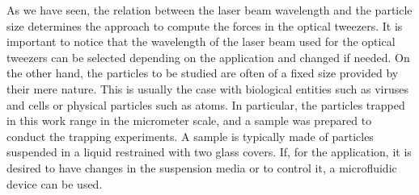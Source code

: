 \documentclass[letterpaper,12pt,oneside]{book}
\begin{document}
\noindent As we have seen, the relation between the laser beam wavelength and the particle size determines the approach to compute the forces in the optical tweezers. It is important to notice that the wavelength of the laser beam used for the optical tweezers can be selected depending on the application and changed if needed. On the other hand, the particles to be studied are often of a fixed size provided by their mere nature. This is usually the case with biological entities such as viruses and cells or physical particles such as atoms. In particular, the particles trapped in this work range in the micrometer scale, and a sample was prepared to conduct the trapping experiments. A sample is typically made of particles suspended in a liquid restrained with two glass covers. %
If, for the application, it is desired to have changes in the suspension media or to control it, a microfluidic device can be used.  %
\end{document}
